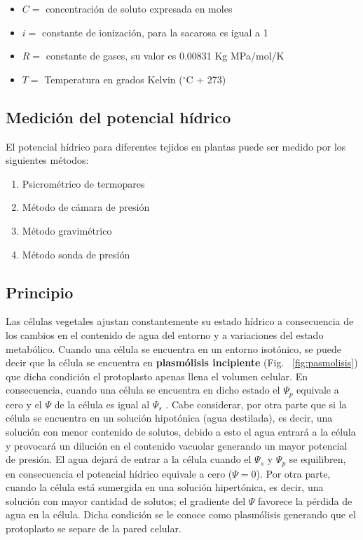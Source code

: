 \begin{itemize}
	\item $C = $ concentraci\'on de soluto expresada en moles
	\item $i = $ constante de ionizaci\'on, para la sacarosa es igual a 1
	\item $R = $ constante de gases, su valor es 0.00831 Kg MPa/mol/K
	\item $T = $ Temperatura en grados Kelvin ($^\circ$C + 273) 
\end{itemize}

\subsection{Medici\'on del potencial h\'idrico}

El potencial h\'idrico para diferentes tejidos en plantas puede ser medido por los siguientes m\'etodos:

\begin{enumerate}
	\item Psicrom\'etrico de termopares
	\item M\'etodo de c\'amara de presi\'on
	\item M\'etodo gravim\'etrico 
	\item M\'etodo sonda de presi\'on
\end{enumerate}


\subsection{Principio}

Las c\'elulas vegetales ajustan constantemente su estado h\'idrico a consecuencia de los cambios en el contenido de agua del entorno y a variaciones del estado metab\'olico. Cuando una c\'elula se encuentra en un entorno isot\'onico, se puede decir que la c\'elula se encuentra en \textbf{plasm\'olisis incipiente} (Fig. ~\ref{fig:pasmolisis}) que dicha condici\'on el protoplasto apenas llena el volumen celular. En consecuencia, cuando una c\'elula se encuentra en dicho estado el $\Psi_p$ equivale a cero y el $\Psi$ de la c\'elula es igual al $\Psi_s$ \citep{NOBEL2020491}. Cabe considerar, por otra parte que si la c\'elula se encuentra en un soluci\'on hipot\'onica (agua destilada), es decir, una soluci\'on con menor contenido de solutos, debido a esto el agua entrar\'a a la c\'elula y provocar\'a un diluci\'on en el contenido vacuolar generando un mayor potencial de presi\'on. El agua dejar\'a de entrar a la c\'elula cuando el $\Psi_s$ y $\Psi_p$ se equilibren, en consecuencia el potencial h\'idrico equivale a cero ($\Psi = 0$). Por otra parte, cuando la c\'elula est\'a sumergida en una soluci\'on hipert\'onica, es decir, una soluci\'on con mayor cantidad de solutos; el gradiente del $\Psi$ favorece la p\'erdida de agua en la c\'elula. Dicha condici\'on se le conoce como plasm\'olisis generando que el protoplasto se separe de la pared celular. 

